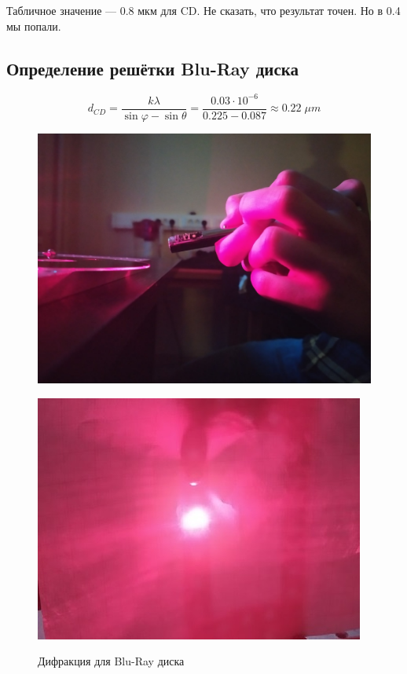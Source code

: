 \documentclass[titlepage, a4paper,12pt]{article}
\begin{document}
	Табличное значение --- 0.8 мкм для CD. Не сказать, что результат точен. Но в 0.4 мы попали.
	
		\subsection{Определение решётки Blu-Ray диска}
	
	$$ d_{CD} = \frac{k \lambda}{\sin\varphi - \sin\theta} = \frac{ 0.03 \cdot 10^{-6}}{0.225 - 0.087} \approx 0.22 \; \mu m $$
	
	\begin{figure}[h!]
		\begin{center}
			\begin{minipage}[h]{0.49\linewidth}
				\includegraphics[width=1\linewidth]{6_1}
				\label{ris:6.1} %
			\end{minipage}
		\hfill
			\begin{minipage}[h]{0.49\linewidth}
				\includegraphics[width=1\linewidth]{6_2}
				\label{ris:6.2}
			\end{minipage}
			\caption{Дифракция для Blu-Ray диска}
		\end{center}
	\end{figure}
	
\end{document}
